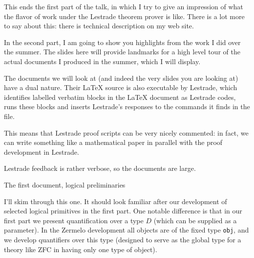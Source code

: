 \documentclass{slides}
\begin{document}
\begin{slide}

This ends the first part of the talk, in which I try to give an impression of what the flavor of work under the Lestrade theorem prover is like.  There is a lot more to say about this:
there is technical description on my web site.

In the second part, I am going to show you highlights from the work I did over the summer.  The slides here will provide landmarks for a high level tour of the actual documents
I produced in the summer, which I will display.

\end{slide}

\begin{slide}

The documents we will look at (and indeed the very slides you are looking at) have a dual nature.  Their LaTeX source is also executable by Lestrade, which identifies labelled verbatim
blocks in the LaTeX document as Lestrade codes, runs these blocks and inserts Lestrade's responses to the commands it finds in the file.

This means that Lestrade proof scripts can be very nicely commented: in fact, we can write something like a mathematical paper in parallel with the proof development in Lestrade.

Lestrade feedback is rather verbose, so the documents are large.

\end{slide}

\begin{slide}

{\Large The first document, logical preliminaries}

I'll skim through this one.  It should look familiar after our development of selected logical primitives in the first part.  One notable difference is that in our first part
we present quantification over a type $D$ (which can be supplied as a parameter).  In the Zermelo development all objects are of the fixed type {\tt obj}, and we develop
quantifiers over this type (designed to serve as the global type for a theory like ZFC in having only one type of object).

\end{slide}
\end{document}
